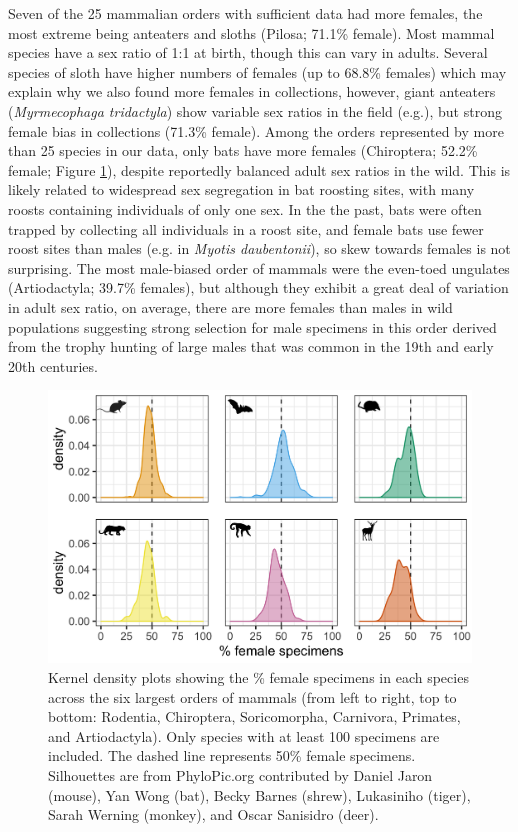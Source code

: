 \documentclass[a4paper, 12pt]{article}
\begin{document}
Seven of the 25 mammalian orders with sufficient data had more females, the most extreme being anteaters and sloths (Pilosa; 71.1\% female). 
Most mammal species have a sex ratio of 1:1 at birth\cite{karlin1986theoretical}, though this can vary in adults. 
Several species of sloth have higher numbers of females (up to 68.8\% females\cite{reyes2015informacion}) which may explain why we also found more females in collections, however, giant anteaters (\textit{Myrmecophaga tridactyla}) show variable sex ratios in the field (e.g.\cite{anteater2005}), but strong female bias in collections (71.3\% female). 
Among the orders represented by more than 25 species in our data, only bats have more females (Chiroptera; 52.2\% female; Figure \ref{fig-mammal_order_six}), despite reportedly balanced adult sex ratios in the wild\cite{altringham}. 
This is likely related to widespread sex segregation in bat roosting sites, with many roosts containing individuals of only one sex\cite{altringham}. 
In the the past, bats were often trapped by collecting all individuals in a roost site, and female bats use fewer roost sites than males (e.g. in \textit{Myotis daubentonii}\cite{encarnaccao2012spatiotemporal}), so skew towards females is not surprising. 
The most male-biased order of mammals were the even-toed ungulates (Artiodactyla; 39.7\% females), but although they exhibit a great deal of variation in adult sex ratio, on average, there are more females than males in wild populations\cite{berger1999sex} suggesting strong selection for male specimens in this order derived from the trophy hunting of large males that was common in the 19th and early 20th centuries.

\begin{figure}
 \centering
  \includegraphics[width = \linewidth]{figures/orders-density-mammals-six.png}
  \caption{Kernel density plots showing the \% female specimens in each species across the six largest orders of mammals (from left to right, top to bottom: Rodentia, Chiroptera, Soricomorpha, Carnivora, Primates, and Artiodactyla). 
  Only species with at least 100 specimens are included. 
  The dashed line represents 50\% female specimens. 
  Silhouettes are from PhyloPic.org contributed by Daniel Jaron (mouse), Yan Wong (bat), Becky Barnes (shrew), Lukasiniho (tiger), Sarah Werning (monkey), and Oscar Sanisidro (deer).
}
  \label{fig-mammal_order_six}
\end{figure}
\end{document}
